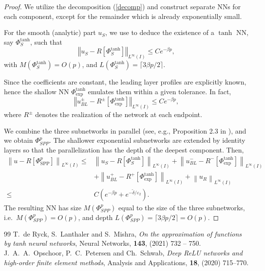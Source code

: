 \documentclass[10pt,a4paper]{amsart}
\newcommand{\ceil}[1]{\lceil #1 \rceil}
\begin{document}
\begin{proof}
We utilize the decomposition (\ref{decomp}) and construct separate NNs for each component, except for the remainder which is already exponentially small.

For the smooth (analytic) part $u_S$, we use \cite[Cor. 5.8]{Mishra} to deduce the existence of a $\tanh$ NN, say $\Phi^{\tanh}_S$, such that 
$$
\left\Vert u_S - R\left[\Phi^{\tanh}_{S}\right] \right\Vert_{L^{\infty}(I)} \leq C e^{-\beta p},
$$
with $M(\Phi^{\tanh}_S) = O(p)$, and $L(\Phi^{\tanh}_S) = \ceil{3 \beta p/2}$.

Since the coefficients are constant, the leading layer profiles are explicitly known, hence the shallow NN $\Phi^{\tanh}_{\text{exp}}$ emulates them within a given tolerance. In fact,
%
$$
\left\Vert u^{\pm}_{BL} - R^{\pm}\left[\Phi^{\tanh}_{\text{exp}}\right] \right\Vert_{L^{\infty}(I)} \leq C e^{-\beta p},
$$
where $R^{\pm}$ denotes the realization of the network at each endpoint.

We combine the three subnetworks in parallel (see, e.g., Proposition 2.3 in \cite{OPS}), and we obtain $\Phi^p_{SPP}$. The shallower exponential subnetworks are extended by identity layers so that the parallelization has the depth of the deepest component. Then,
$$
\begin{aligned}
\left\|u-R\left[\Phi_{\mathrm{SPP}}^p\right]\right\|_{L^{\infty}(I)} \leq & \left\|u_S-R\left[\Phi^{\tanh}_S\right]\right\|_{L^{\infty}(I)}+\left\|u_{BL}^{-}-R^{-}\left[\Phi_{\text{exp}}^{\tanh}\right]\right\|_{L^{\infty}(I)} \\
& +\left\|u_{BL}^{+}-R^{+}\left[\Phi_{\text{exp}}^{\tanh}\right]\right\|_{L^{\infty}(I)}+\left\|u_R\right\|_{L^{\infty}(I)} \\
\leq & C\left(e^{-\beta p}+e^{-\tilde{\delta} / \varepsilon_2}\right) .
\end{aligned}
$$
The resulting NN has size $M(\Phi_{SPP}^p)$ equal to the size of the three subnetworks, i.e.~$M(\Phi_{SPP}^p)=O(p)$,
and depth $L(\Phi_{SPP}^p) = \ceil{3 \beta p/2}=O(p)$.
\end{proof}

\begin{thebibliography}{99}
 T.~de Ryck, S.~Lanthaler and S.~Mishra, \emph{On the approximation of functions by tanh neural networks}, Neural Networks, \textbf{143}, (2021) 732 -- 750.
 J.~A.~A.~Opschoor, P.~C.~Petersen and Ch.~Schwab, \emph{Deep ReLU networks and high-order finite element methods}, Analysis and Applications, \textbf{18}, (2020) 715--770.
\end{thebibliography}
\end{document}
